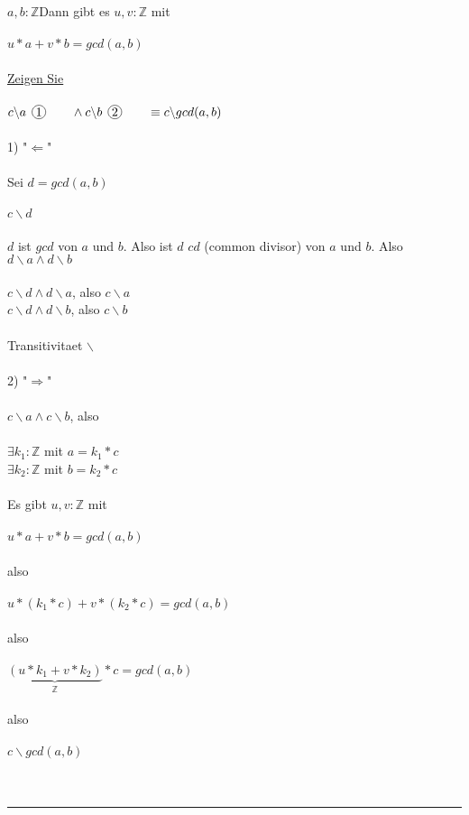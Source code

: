 \documentclass[18pt,a4paper]{article}
\newcommand*\circled[1]{\tikz[baseline=(char.base)]{
            \node[shape=circle,draw,inner sep=1pt] (char) {#1};}}
\newcommand{\tab}{\hspace*{2em}}
\begin{document}
$a,b : \mathbb{Z}$\tab Dann gibt es $u,v :\mathbb{Z}$ mit\\
\\
\tab $u*a + v*b  = gcd(a,b)$\\
\\
\uline{Zeigen Sie}\\
\\
$c\backslash a\:\: \circled{1}\tab   \wedge c\backslash b \:\: \circled{2}\tab  \equiv c\backslash gcd(a,b) $\\
\\
1) "$\Leftarrow$"\\
\\
Sei $d = gcd(a,b)$\\
\\
$c\backslash d$\\
\\
$d$ ist \uline{$gcd$} von $a$ und $b$. Also ist $d$ \uline{$cd$} (common divisor) von $a$ und $b$. Also $d\backslash a\wedge d\backslash b$\\
\\
$c\backslash d\wedge d\backslash a$, also $c\backslash a$\\
$c\backslash d\wedge d\backslash b$, also $c\backslash b$\\
\\
Transitivitaet $\backslash$\\
\\
2) "$\Rightarrow$"\\
\\
$c\backslash a\wedge c\backslash b$, also\\
\\
$\exists{k_1}:\mathbb{Z}$ mit $a=k_1*c$\\
$\exists{k_2}:\mathbb{Z}$ mit $b=k_2*c$\\
\\
Es gibt $u,v : \mathbb{Z}$ mit\\
\\
\tab $u*a + v*b = gcd(a,b)$\\
\\
also\\
\\
\tab $u*(k_1*c) + v*(k_2*c) = gcd(a,b)$\\
\\
also\\
\\
\tab $\underbrace{(u*k_1 + v*k_2)}_\text{$\mathbb{Z}$}*c = gcd(a,b)$\\
\\
also\\
\\
\tab $c\backslash gcd(a,b)$\\
\\
\\
\rule{\textwidth}{0.4mm}\\
\\
\end{document}
